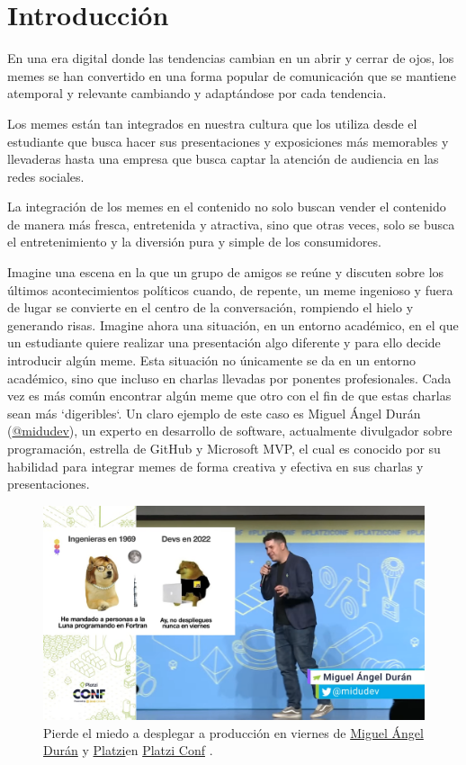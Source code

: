 \chapter{Introducción}

En una era digital donde las tendencias cambian en un abrir y cerrar de ojos, los memes se han convertido en una forma popular de comunicación que se mantiene atemporal y relevante cambiando y adaptándose por cada tendencia.

Los memes están tan integrados en nuestra cultura que los utiliza desde el estudiante que busca hacer sus presentaciones y exposiciones más memorables y llevaderas hasta una empresa que busca captar la atención de audiencia en las redes sociales.

La integración de los memes en el contenido no solo buscan vender el contenido de manera más fresca, entretenida y atractiva, sino que otras veces, solo se busca el entretenimiento y la diversión pura y simple de los consumidores.

Imagine una escena en la que un grupo de amigos se reúne y discuten sobre los últimos acontecimientos políticos cuando, de repente, un meme ingenioso y fuera de lugar se convierte en el centro de la conversación, rompiendo el hielo y generando risas. Imagine ahora una situación, en un entorno académico, en el que un estudiante quiere realizar una presentación algo diferente y para ello decide introducir algún meme. Esta situación no únicamente se da en un entorno académico, sino que incluso en charlas llevadas por ponentes profesionales. Cada vez es más común encontrar algún meme que otro con el fin de que estas charlas sean más `digeribles`. Un claro ejemplo de este caso es Miguel Ángel Durán (\href{https://midu.dev/}{@midudev}), un experto en desarrollo de software, actualmente divulgador sobre programación, estrella de GitHub y Microsoft MVP, el cual es conocido por su habilidad para integrar memes de forma creativa y efectiva en sus charlas y presentaciones.

\begin{figure}[ht]
    \caption{Pierde el miedo a desplegar a producción en viernes de \href{https://midu.dev/}{Miguel Ángel Durán} y \href{https://platzi.com/}{Platzi}en \href{https://platzi.com/conf/}{Platzi Conf} \cite{confe}.}
    \centering
    \vspace*{0.5cm}
    \includegraphics[scale=0.15]{figuras/platziconfmidudev.png}
\end{figure}

